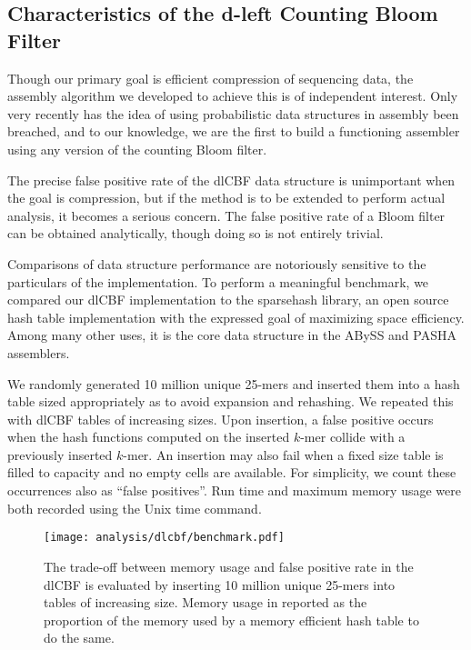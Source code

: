 \documentclass[twocolumn]{article}
\begin{document}
\subsection{Characteristics of the d-left Counting Bloom Filter}

\label{section:dlcbf_results}

Though our primary goal is efficient compression of sequencing data, the
assembly algorithm we developed to achieve this is of independent interest.
Only very recently has the idea of using probabilistic data structures in
assembly been breached, and to our knowledge, we are the first to build
a functioning assembler using any version of the counting Bloom filter.

The precise false positive rate of the dlCBF data structure is unimportant
when the goal is compression, but if the method is to be extended to perform
actual analysis, it becomes a serious concern. The false positive rate of a
Bloom filter can be obtained analytically, though doing so is not entirely
trivial.

Comparisons of data structure performance are notoriously sensitive to the
particulars of the implementation. To perform a meaningful benchmark, we
compared our dlCBF implementation to the sparsehash library, an open source
hash table implementation with the expressed goal of maximizing space
efficiency. Among many other uses, it is the core data structure in the ABySS
\citep{Simpson2011} and PASHA \citep{Liu2011} assemblers.

We randomly generated 10 million unique 25-mers and inserted them into a hash
table sized appropriately as to avoid expansion and rehashing. We repeated
this with dlCBF tables of increasing sizes. Upon insertion, a false positive
occurs when the hash functions computed on the inserted $k$-mer collide with a
previously inserted $k$-mer. An insertion may also fail when a fixed size
table is filled to capacity and no empty cells are available. For simplicity,
we count these occurrences also as ``false positives''. Run time and maximum memory
usage were both recorded using the Unix time command.

\begin{figure}[h]
\centerline{\texttt{[image: analysis/dlcbf/benchmark.pdf]}}
\caption{
The trade-off between memory usage and false positive rate in the dlCBF is
evaluated by inserting 10 million unique 25-mers into tables of increasing
size. Memory usage in reported as the proportion of the memory used by a
memory efficient hash table to do the same.
}
\label{fig:dlcbf_bench}
\end{figure}
\end{document}
